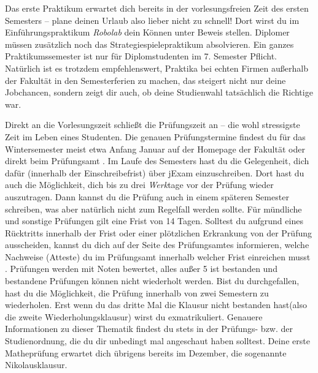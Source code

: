 Das erste Praktikum erwartet dich bereits in der vorlesungsfreien Zeit des ersten Semesters – plane deinen Urlaub also lieber nicht zu schnell!
Dort wirst du im Einführungspraktikum \textit{Robolab} dein Können unter Beweis stellen. Diplomer müssen zusätzlich noch das Strategiespielepraktikum absolvieren.
Ein ganzes Praktikumssemester ist nur für Diplomstudenten im 7. Semester Pflicht.
Natürlich ist es trotzdem empfehlenswert, Praktika bei echten Firmen außerhalb der Fakultät in den Semesterferien zu machen, das steigert nicht nur deine Jobchancen,
sondern zeigt dir auch, ob deine Studienwahl tatsächlich die Richtige war.

\label{sec:pruefungen}
Direkt an die Vorlesungszeit schließt die Prüfungszeit an – die wohl stressigste Zeit im Leben eines Studenten.
Die genauen Prüfungstermine findest du für das Wintersemester meist etwa Anfang Januar auf der Homepage der Fakultät  oder direkt beim Prüfungsamt .
Im Laufe des Semesters hast du die Gelegenheit, dich dafür (innerhalb der Einschreibefrist) über jExam einzuschreiben.
Dort hast du auch die Möglichkeit, dich bis zu drei \emph{Werk}tage vor der Prüfung wieder auszutragen. Dann kannst du die Prüfung auch in einem späteren Semester schreiben, was aber natürlich
nicht zum Regelfall werden sollte. Für mündliche und sonstige Prüfungen gilt eine Frist von 14 Tagen.
Solltest du aufgrund eines Rücktritts innerhalb der Frist oder einer plötzlichen Erkrankung von der Prüfung ausscheiden, kannst du dich auf der Seite des Prüfungsamtes informieren,
welche Nachweise (Atteste) du im Prüfungsamt innerhalb welcher Frist einreichen musst .
Prüfungen werden mit Noten bewertet, alles außer 5 ist bestanden und bestandene Prüfungen können nicht wiederholt werden.
Bist du durchgefallen, hast du die Möglichkeit, die Prüfung innerhalb von zwei Semestern zu wiederholen. Erst wenn du das dritte Mal die Klausur nicht bestanden hast(also die zweite Wiederholungsklausur) wirst du exmatrikuliert.
Genauere Informationen zu dieser Thematik findest du stets in der Prüfungs- bzw. der Studienordnung, die du dir unbedingt mal angeschaut haben solltest.
Deine erste Matheprüfung erwartet dich übrigens bereits im Dezember, die sogenannte Nikolausklausur.

